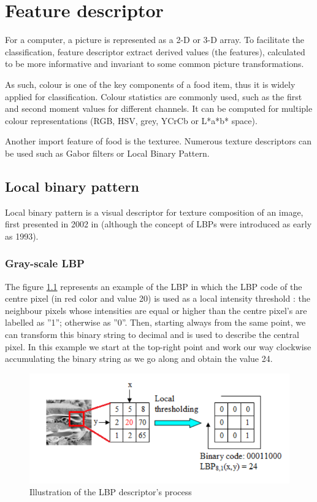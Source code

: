 \chapter{Feature descriptor} \label{sec:feature_descriptor}

For a computer, a picture is represented as a 2-D or 3-D array. To facilitate the classification, feature descriptor extract derived values (the features), calculated to be more informative and invariant to some common picture transformations.

As such, colour is one of the key components of a food item, thus it is widely applied for classification. Colour statistics are commonly used, such as the first and second moment values for different channels. It can be computed for multiple colour representations (RGB, HSV, grey, YCrCb or L*a*b* space).

Another import feature of food is the texturee. Numerous texture descriptors can be used such as Gabor filters or Local Binary Pattern.

\section{Local binary pattern}


Local binary pattern is a visual descriptor for texture composition of an image, first presented in 2002 in \cite{Ojala2002} (although the concept of LBPs were introduced as early as 1993).

\subsection{Gray-scale LBP}

The figure \ref{fig:lbp_process} represents an example of the LBP in which the LBP code of the centre pixel (in red color and value 20) is used as a local intensity threshold : the neighbour pixels whose intensities are equal or higher than the centre pixel’s are labelled as ”1”; otherwise as ”0”. Then, starting always from the same point, we can transform this binary string to decimal and is used to describe the central pixel. In this example we start at the top-right point and work our way clockwise accumulating the binary string as we go along and obtain the value 24.

\begin{figure}[h]
    \includegraphics[scale=0.55]{img/lbp}
    \caption{Illustration of the LBP descriptor's process}
    \label{fig:lbp_process}
\end{figure}

